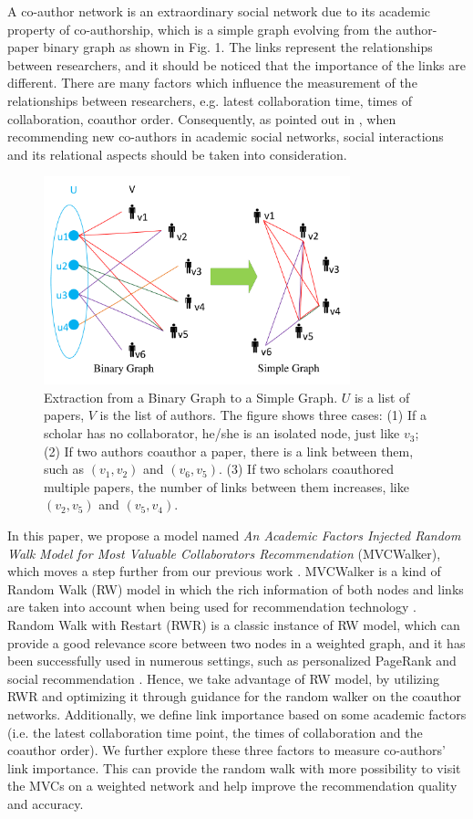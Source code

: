 \documentclass[10pt,journal,compsoc]{IEEEtran}
\begin{document}
A co-author network is an extraordinary social network due to its academic property of co-authorship, which is a simple graph evolving from the author-paper binary graph as shown in Fig. 1. The links represent the relationships between researchers, and it should be noticed that the importance of the links are different. There are many factors which influence the measurement of the relationships between researchers, e.g. latest collaboration time, times of collaboration, coauthor order. Consequently, as pointed out in \cite{Lopes:Colleboration}, when recommending new co-authors in academic social networks, social interactions and its relational aspects should be taken into consideration.
\begin{figure}
\centering
\includegraphics [width=3.5in]{Fig1.pdf}
\caption{Extraction from a Binary Graph to a Simple Graph. $U$ is a list of papers, $V$ is the list of authors. The figure shows three cases: (1) If a scholar has no collaborator, he/she is an isolated node, just like $v_{3}$; (2) If two authors coauthor a paper, there is a link between them, such as $(v_{1}, v_{2})$ and $(v_{6}, v_{5})$. (3) If two scholars coauthored multiple papers, the number of links between them increases, like $(v_{2}, v_{5})$ and $(v_{5}, v_{4})$.}
\end{figure}

In this paper, we propose a model named \emph{An Academic Factors Injected Random Walk Model for Most Valuable Collaborators Recommendation} (MVCWalker), which moves a step further from our previous work \cite{Jing:ACRec}. MVCWalker is a kind of Random Walk (RW) model in which the rich information of both nodes and links are taken into account when being used for recommendation technology \cite{Backstrom:Supervised}. Random Walk with Restart (RWR) is a classic instance of RW model, which can provide a good relevance score between two nodes in a weighted graph, and it has been successfully used in numerous settings, such as personalized PageRank and social recommendation \cite{tong2006fast}. Hence, we take advantage of RW model, by utilizing RWR and optimizing it through guidance for the random walker on the coauthor networks. Additionally, we define link importance based on some academic factors (i.e. the latest collaboration time point, the times of collaboration and the coauthor order). We further explore these three factors to measure co-authors' link importance. This can provide the random walk with more possibility to visit the MVCs on a weighted network and help improve the recommendation quality and accuracy.
\end{document}
